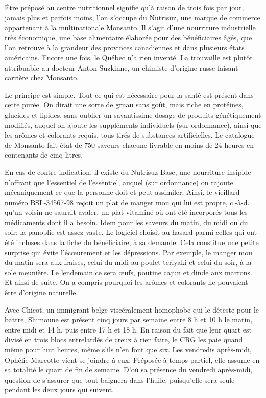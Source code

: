 Être préposé au centre nutritionnel signifie qu’à raison de trois fois par jour, jamais plus et parfois moins, l’on s’occupe du Nutrisuz, une marque de commerce appartenant à la multinationale Monsanto. Il s’agit d’une nourriture industrielle très économique, une base alimentaire élaborée pour des bénéficiaires âgés, que l’on retrouve à la grandeur des provinces canadiennes et dans plusieurs états américains. Encore une fois, le Québec n’a rien inventé. La trouvaille est plutôt attribuable au docteur Anton Suzkinne, un chimiste d’origine russe faisant carrière chez Monsanto.

Le principe est simple. Tout ce qui est nécessaire pour la santé est présent dans cette purée. On dirait une sorte de gruau sans goût, mais riche en protéines, glucides et lipides, sans oublier un savantissime dosage de produits génétiquement modifiés, auquel on ajoute les suppléments individuels (sur ordonnance), ainsi que les arômes et colorants requis, tous tirés de substances artificielles. Le catalogue de Monsanto fait état de 750 saveurs chacune livrable en moins de 24 heures en contenants de cinq litres.

En cas de contre-indication, il existe du Nutrisuz Base, une nourriture insipide n’offrant que l’essentiel de l’essentiel, auquel (sur ordonnance) on rajoute mécaniquement ce que la personne doit et peut assimiler. Ainsi, le vieillard numéro BSL-34567-98 reçoit un plat de manger mou qui lui est propre, c.-à-d. qu’un voisin ne saurait avaler, un plat vitaminé où ont été incorporés tous les médicaments dont il a besoin. Idem pour les saveurs du matin, du midi ou du soir; la panoplie est assez vaste. Le logiciel choisit au hasard parmi celles qui ont été incluses dans la fiche du bénéficiaire, à sa demande. Cela constitue une petite surprise qui évite l’écœurement et les dépressions. Par exemple, le manger mou du matin sera aux fraises, celui du midi au poulet teriyaki et celui du soir, à la sole meunière. Le lendemain ce sera œufs, poutine cajun et dinde aux marrons. Et ainsi de suite. On a compris pourquoi les arômes et colorants ne pouvaient être d’origine naturelle.

Avec Chicot, un immigrant belge viscéralement homophobe qui le déteste pour le battre, Shimoune est présent cinq jours par semaine entre 8 h et 10 h le matin, entre midi et 14 h, puis entre 17 h et 18 h. En raison du fait que leur quart est divisé en trois blocs entrelardés de creux à rien faire, le CRG les paie quand même pour huit heures, même s’ils n’en font que six. Les vendredis après-midi, Ophélie Marcotte vient se joindre à eux. Préposée à temps partiel, elle assume en sa totalité le quart de fin de semaine. D’où sa présence du vendredi après-midi, question de s’assurer que tout baignera dans l’huile, puisqu’elle sera seule pendant les deux jours qui suivent.

